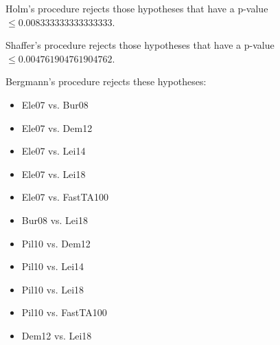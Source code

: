 \documentclass[a4paper,10pt]{article}
\begin{document}
\begin{landscape}
Holm's procedure rejects those hypotheses that have a p-value $\le0.008333333333333333$.


Shaffer's procedure rejects those hypotheses that have a p-value $\le0.004761904761904762$.


Bergmann's procedure rejects these hypotheses:


\begin{itemize}


\item Ele07 vs. Bur08
\item Ele07 vs. Dem12
\item Ele07 vs. Lei14
\item Ele07 vs. Lei18
\item Ele07 vs. FastTA100
\item Bur08 vs. Lei18
\item Pil10 vs. Dem12
\item Pil10 vs. Lei14
\item Pil10 vs. Lei18
\item Pil10 vs. FastTA100
\item Dem12 vs. Lei18
\end{itemize}



\end{landscape}
\end{document}
